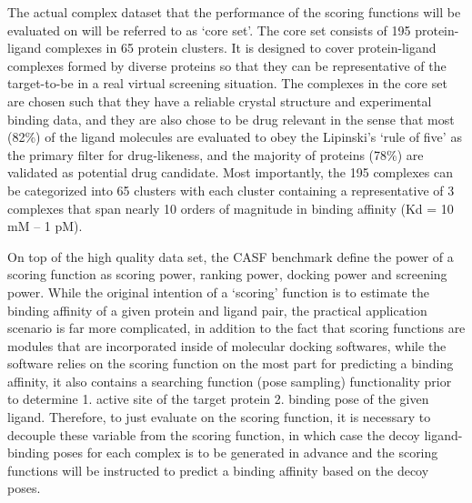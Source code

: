 The actual complex dataset that the performance of the scoring functions will be evaluated on will be referred to as `core set'. 
The core set consists of 195 protein-ligand complexes in 65 protein clusters.
It is designed to cover protein-ligand complexes formed by diverse proteins 
so that they can be representative of the target-to-be in a real virtual screening situation.
The complexes in the core set are chosen such that they have a reliable crystal structure and experimental binding data, and they are also chose to be drug relevant in the sense that most (82\%) of the ligand molecules are evaluated to obey the Lipinski's `rule of five' as the primary filter for drug-likeness, and the majority of proteins (78\%) are validated as potential drug candidate.
Most importantly, the 195 complexes can be categorized into 65 clusters with each cluster containing a representative of 3 complexes that span nearly 10 orders of magnitude in binding affinity (Kd = 10 mM – 1 pM).

On top of the high quality data set, the CASF benchmark define the power of a scoring function as scoring power, ranking power, docking power and screening power.
While the original intention of a `scoring' function is to estimate the binding affinity of a given protein and ligand pair, the practical application scenario is far more complicated, in addition to the fact that scoring functions are modules that are incorporated inside of molecular docking softwares, 
while the software relies on the scoring function on the most part for predicting a binding affinity, it also contains a searching function (pose sampling) functionality prior to determine 1. active site of the target protein 2. binding pose of the given ligand.
Therefore, to just evaluate on the scoring function, it is necessary to decouple these variable from the scoring function, in which case the decoy ligand-binding poses for each complex is to be generated in advance and the scoring functions will be instructed to predict a binding affinity based on the decoy poses.

